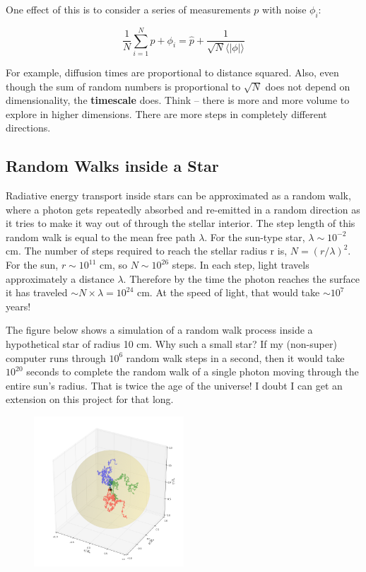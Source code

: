 \documentclass{article}
\begin{document}
One effect of this is to consider a series of measurements $p$ with noise $\phi_i$:

\begin{equation}
    \frac{1}{N} \sum_{i=1}^{N} p+\phi_i = \hat{p} + \frac{1}{\sqrt{N}\langle |\phi|\rangle}
\end{equation}

For example, diffusion times are proportional to distance squared. Also, even though the sum of random numbers is proportional to $\sqrt{N}$ does not depend on dimensionality, the \textbf{timescale} does. Think -- there is more and more volume to explore in higher dimensions. There are more steps in completely different directions.

\subsection{Random Walks inside a Star}

Radiative energy transport inside stars can be approximated as a random walk, where a photon gets repeatedly absorbed and re-emitted in a random direction as it tries to make it way out of through the stellar interior. The step length of this random walk is equal to the mean free path $\lambda$. For the sun-type star, $\lambda \sim 10^{-2}$ cm. The number of steps required to reach the stellar radius r is, $N = (r/\lambda)^{2}$. For the sun, $r \sim 10^{11}$ cm, so $N \sim 10^{26} $ steps. In each step, light travels approximately a distance $\lambda$. Therefore by the time the photon reaches the surface it has traveled $\sim N \times \lambda = 10^{24}$ cm. At the speed of light, that would take $\sim 10^{7}$ years! 

The figure below shows a simulation of a random walk process inside a hypothetical star of radius 10 cm. Why such a small star? If my (non-super) computer runs through $10^{6}$ random walk steps in a second, then it would take $10^{20}$ seconds to complete the random walk of a single photon moving through the entire sun's radius. That is twice the age of the universe! I doubt I can get an extension on this project for that long. 

\begin{figure}[h!]
    \centering
    \includegraphics[width=0.5\textwidth]{figures/Random_walk.png}
    \caption{}
    \label{fig:random_walk}
\end{figure}
\end{document}
